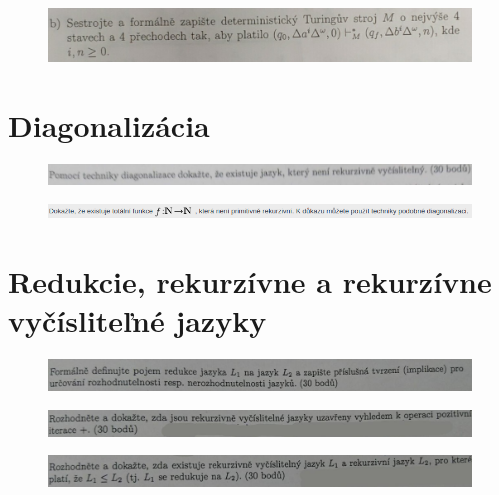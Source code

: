 \documentclass[]{article}
\begin{document}
	\begin{figure}[H]
		\includegraphics[width=\textwidth]{tasks/ts/task2.png}
	\end{figure}
	
	\section{Diagonalizácia}
	
	\begin{figure}[H]
		\includegraphics[width=\textwidth]{tasks/diagonalizacia/task1.png}
	\end{figure}

	\begin{figure}[H]
		\includegraphics[width=\textwidth]{tasks/diagonalizacia/task2.png}
	\end{figure}
	
	\section{Redukcie, rekurzívne a rekurzívne vyčísliteľné jazyky}
	
	\begin{figure}[H]
		\includegraphics[width=\textwidth]{tasks/redukcie/task1.png}
	\end{figure}

	\begin{figure}[H]
		\includegraphics[width=\textwidth]{tasks/redukcie/task2.png}
	\end{figure}
	
	\begin{figure}[H]
		\includegraphics[width=\textwidth]{tasks/redukcie/task3.png}
	\end{figure}
	
\end{document}
